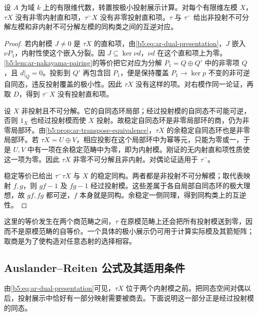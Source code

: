 \begin{lemma}\label{b5:lem:ar-translate-indecomposable}
	设 \(A\) 为域 \(k\) 上的有限维代数，转置按极小投射展示计算。对每个有限维左模 \(X\)，\(\tau X\) 没有非零内射直和项，\(\tau^-X\) 没有非零投射直和项。\(\tau\) 与 \(\tau^-\) 给出非投射不可分解左模和非内射不可分解左模的同构类之间的互逆对应。
\end{lemma}
\begin{proof}
	若内射模 \(J\ne0\) 是 \(\tau X\) 的直和项，由\eqref{b5:eq:ar-dual-presentation}，\(J\) 嵌入 \(\nu P_1\)，内射性使这个嵌入分裂。因 \(J\subseteq\ker\nu d\)，\(\nu d\) 在这个直和项上为零。\cref{b5:lem:ar-nakayama-pairing}的等价把它对应为分解 \(P_1=Q\oplus Q'\) 中的非零项 \(Q\)，且 \(d|_Q=0\)。投影到 \(Q'\) 再包含回 \(P_1\)，便是保持覆盖 \(P_1\to\ker p\) 不变的非可逆自同态，违反投射覆盖的极小性。因此 \(\tau X\) 没有这样的项。对右模作同一论证，再取 \(D\)，得到 \(\tau^-X\) 没有投射直和项。

	设 \(X\) 非投射且不可分解。它的自同态环局部；经过投射模的自同态不可能可逆，否则 \(1_X\) 也经过投射模而使 \(X\) 投射。故稳定自同态环是非零局部环的商，仍为非零局部环。由\cref{b5:prop:ar-transpose-equivalence}，\(\tau X\) 的余稳定自同态环也是非零局部环。若 \(\tau X=U\oplus V\)，相应投影在这个局部环中为幂等元，只能为零或一，于是 \(U,V\) 中有一项在余稳定范畴中为零，即为内射模。刚证的无内射直和项性质使这一项为零。因此 \(\tau X\) 非零不可分解且非内射。对偶论证适用于 \(\tau^-\)。

	稳定等价已给出 \(\tau^-\tau X\) 与 \(X\) 的稳定同构。两者都是非投射不可分解模；取代表映射 \(f,g\)，则 \(gf-1\) 及 \(fg-1\) 经过投射模。这些差属于各自局部自同态环的极大理想，故 \(gf,fg\) 都可逆，\(f\) 本身就是同构。余稳定一侧同理，得到同构类上的互逆性。
\end{proof}

这里的等价发生在两个商范畴之间，\(\tau\) 在原模范畴上还会把所有投射模送到零，因而不是原模范畴的自等价。一个具体的极小展示仍可用于计算实际模及其箭矩阵；取商是为了使构造对任意态射的选择相容。

\subsection{Auslander–Reiten 公式及其适用条件}
\label{b5:subsec:1006:03}

由\eqref{b5:eq:ar-dual-presentation}可见，\(\tau X\) 位于两个内射模之前。把同态空间对偶以后，投射展示中恰好有一部分映射需要被商去。下面说明这一部分正是经过投射模的同态。

